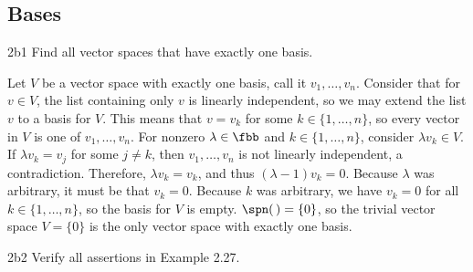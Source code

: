 \subsection{Bases}

\begin{exercise}{2b1}
    Find all vector spaces that have exactly one basis.

\end{exercise}

\begin{sol}
    Let $V$ be a vector space with exactly one basis, call it $v_1, \dots, v_n$.
    Consider that for $v \in V$, the list containing only $v$ is linearly independent, so we may extend the list $v$ to a basis for $V$.
    This means that $v = v_k$ for some $k \in \{1, \dots, n\}$, so every vector in $V$ is one of $v_1, \dots, v_n$.
    For nonzero $\lambda \in \fbb$ and $k \in \{1, \dots, n\}$, consider $\lambda v_k \in V$.
    If $\lambda v_k = v_j$ for some $j \neq k$, then $v_1, \dots, v_n$ is not linearly independent, a contradiction.
    Therefore, $\lambda v_k = v_k$, and thus $(\lambda - 1)v_k = 0$.
    Because $\lambda$ was arbitrary, it must be that $v_k = 0$.
    Because $k$ was arbitrary, we have $v_k = 0$ for all $k \in \{1, \dots, n\}$, so the basis for $V$ is empty.
    $\spn(\,) = \{0\}$, so the trivial vector space $V = \{0\}$ is the only vector space with exactly one basis.
\end{sol}

\begin{exercise}{2b2}
    Verify all assertions in Example 2.27.
\end{exercise}

